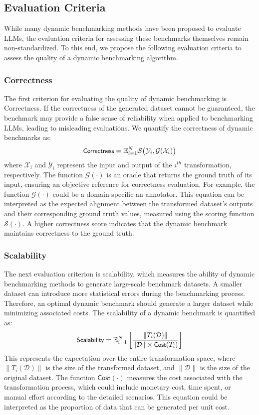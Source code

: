 \subsection{Evaluation Criteria}

While many dynamic benchmarking methods have been proposed to evaluate LLMs, the evaluation criteria for assessing these benchmarks themselves remain non-standardized. To this end, we propose the following evaluation criteria to assess the quality of a dynamic benchmarking algorithm.

\subsubsection{Correctness}
The first criterion for evaluating the quality of dynamic benchmarking is \textsf{Correctness}. If the correctness of the generated dataset cannot be guaranteed, the benchmark may provide a false sense of reliability when applied to benchmarking LLMs, leading to misleading evaluations.  
We quantify the correctness of dynamic benchmarks as:  
$$
\small
    \textsf{Correctness} = \mathbb{E}_{i=1}^{N}  
    \mathcal{S} \big( \mathcal{Y}_i, \mathcal{G}(\mathcal{X}_i) \big)
$$
where \( \mathcal{X}_i \) and \( \mathcal{Y}_i \) represent the input and output of the \( i^{th} \) transformation, respectively. The function \( \mathcal{G}(\cdot) \) is an oracle that returns the ground truth  of its input, ensuring an objective reference for correctness evaluation. For example, the function \( \mathcal{G}(\cdot) \) could be a domain-specific an annotator.  
This equation can be interpreted as the expected alignment between the transformed dataset's outputs and their corresponding ground truth values, measured using the scoring function \( \mathcal{S}(\cdot) \). A higher correctness score indicates that the dynamic benchmark maintains correctness to the ground truth.



\subsubsection{Scalability}
The next evaluation criterion is scalability, which measures the ability of dynamic benchmarking methods to generate large-scale benchmark datasets. A smaller dataset can introduce more statistical errors during the benchmarking process. Therefore, an optimal dynamic benchmark should generate a larger dataset while minimizing associated costs. The scalability of a dynamic benchmark is quantified as:
$$
\small
    \textsf{Scalability} = \mathbb{E}_{i=1}^{N} \left[ \frac{\lVert T_i(\mathcal{D}) \rVert}{\lVert \mathcal{D} \rVert \times \textsf{Cost}(T_i)} \right]
$$
This represents the expectation over the entire transformation space, where \( \lVert T_i(\mathcal{D}) \rVert \) is the size of the transformed dataset, and \( \lVert \mathcal{D} \rVert \) is the size of the original dataset. The function \( \textsf{Cost}(\cdot) \) measures the cost associated with the transformation process, which could include monetary cost, time spent, or manual effort according to the detailed scenarios.
This equation could be interpreted as the proportion of data that can be generated per unit cost.




